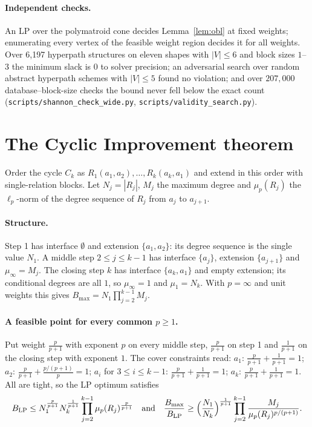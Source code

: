 \documentclass[11pt]{article}
\begin{document}
\paragraph{Independent checks.} An LP over the polymatroid cone decides
Lemma~\ref{lem:obl} at fixed weights; enumerating every vertex of the
feasible weight region decides it for all weights. Over 6{,}197 hyperpath
structures on eleven shapes with $|V|\le6$ and block sizes $1$--$3$ the
minimum slack is $0$ to solver precision; an adversarial search over random abstract
hyperpath schemes with $|V|\le5$ found no violation; and over $207{,}000$ database--block-size checks the bound never fell below the exact count
(\texttt{scripts/shannon\_check\_wide.py},
\texttt{scripts/validity\_search.py}).

\section{The Cyclic Improvement theorem}

Order the cycle $C_k$ as $R_1(a_1,a_2),\dots,R_k(a_k,a_1)$ and extend in
this order with single-relation blocks. Let $N_j=|R_j|$, $M_j$ the maximum
degree and $\mu_p(R_j)$ the $\ell_p$-norm of the degree sequence of $R_j$
from $a_j$ to $a_{j+1}$.

\paragraph{Structure.} Step 1 has interface $\emptyset$ and extension
$\{a_1,a_2\}$: its degree sequence is the single value $N_1$. A middle step
$2\le j\le k-1$ has interface $\{a_j\}$, extension $\{a_{j+1}\}$ and
$\mu_\infty=M_j$. The closing step $k$ has interface $\{a_k,a_1\}$ and
empty extension; its conditional degrees are all $1$, so $\mu_\infty=1$
and $\mu_1=N_k$. With $p=\infty$ and unit weights this gives
$B_{\max}=N_1\prod_{j=2}^{k-1}M_j$.

\paragraph{A feasible point for every common $p\ge1$.} Put weight
$\frac{p}{p+1}$ with exponent $p$ on every middle step, $\frac{p}{p+1}$ on
step 1 and $\frac1{p+1}$ on the closing step with exponent $1$. The cover
constraints read: $a_1$: $\frac p{p+1}+\frac1{p+1}=1$; $a_2$:
$\frac p{p+1}+\frac{p/(p+1)}{p}=1$; $a_i$ for $3\le i\le k-1$:
$\frac p{p+1}+\frac1{p+1}=1$; $a_k$: $\frac p{p+1}+\frac1{p+1}=1$. All are
tight, so the LP optimum satisfies
\[
B_{\mathrm{LP}}\le N_1^{\frac p{p+1}}N_k^{\frac1{p+1}}
\prod_{j=2}^{k-1}\mu_p(R_j)^{\frac p{p+1}}
\quad\text{and}\quad
\frac{B_{\max}}{B_{\mathrm{LP}}}\ge\Bigl(\frac{N_1}{N_k}\Bigr)^{\frac1{p+1}}
\prod_{j=2}^{k-1}\frac{M_j}{\mu_p(R_j)^{p/(p+1)}}.
\]
\end{document}
